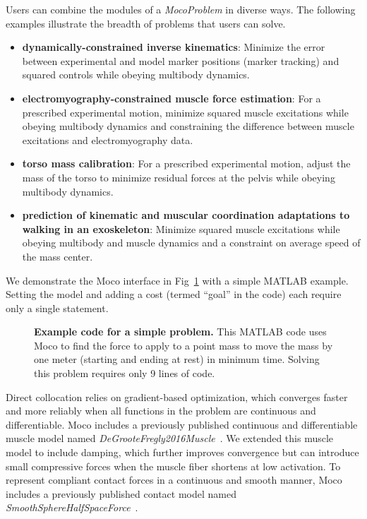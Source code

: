 \documentclass[10pt,letterpaper]{article}
\begin{document}
Users can combine the modules of a \textit{MocoProblem} in diverse ways. The following examples illustrate the breadth of problems that users can solve.
\begin{itemize}
\item \textbf{dynamically-constrained inverse kinematics}: Minimize the error between experimental and model marker positions (marker tracking) and squared controls while obeying multibody dynamics.
\item \textbf{electromyography-constrained muscle force estimation}: For a prescribed experimental motion, minimize squared muscle excitations while obeying multibody dynamics and constraining the difference between muscle excitations and electromyography data.
\item \textbf{torso mass calibration}: For a prescribed experimental motion, adjust the mass of the torso to minimize residual forces at the pelvis while obeying multibody dynamics.
\item \textbf{prediction of kinematic and muscular coordination adaptations to walking in an exoskeleton}: Minimize squared muscle excitations while obeying multibody and muscle dynamics and a constraint on average speed of the mass center.
\end{itemize}

We demonstrate the Moco interface in Fig~\ref{mocoexamplecode} with a simple MATLAB example. Setting the model and adding a cost (termed ``goal'' in the code) each require only a single statement.

\begin{figure}[!h]
    \centering
    \caption{{\bf Example code for a simple problem.}
        This MATLAB code uses Moco to find the force to apply to a point mass to move the mass by one meter (starting and ending at rest) in minimum time. Solving this problem requires only 9 lines of code.}
    \label{mocoexamplecode}
\end{figure}

Direct collocation relies on gradient-based optimization, which converges faster and more reliably when all functions in the problem are continuous and differentiable. Moco includes a previously published continuous and differentiable muscle model named \textit{DeGrooteFregly2016Muscle}~\cite{Groote:2016dq}. We extended this muscle model to include damping, which further improves convergence but can introduce small compressive forces when the muscle fiber shortens at low activation. To represent compliant contact forces in a continuous and smooth manner, Moco includes a previously published contact model named \textit{SmoothSphereHalfSpaceForce}~\cite{Serrancoli:2019aa}.
\end{document}
